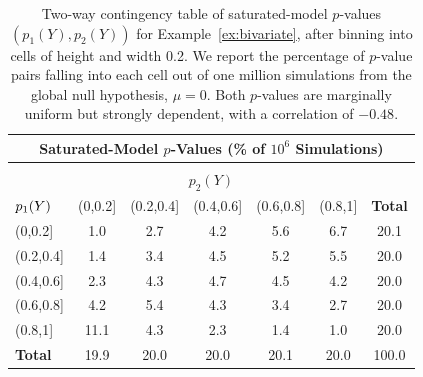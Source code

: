 \documentclass{article}
\begin{document}
\begin{table}[ht]
  \centering
  \begin{tabular}{l|ccccc|c}
    \multicolumn{7}{c}{Saturated-Model $p$-Values 
      (\% of $10^6$ Simulations)}\\[7pt]
    \hline
    \multicolumn{7}{c}{}\\[-1.5ex]
    \multicolumn{7}{c}{$p_2(Y)$}\\[5pt]
    ${\large p_1(Y)}$ & (0,0.2] & (0.2,0.4] & (0.4,0.6] & (0.6,0.8] & (0.8,1] & \textbf{Total} \\ 
    \hline
    (0,0.2] & 1.0 & 2.7 & 4.2 & 5.6 & 6.7 & 20.1 \\ 
    (0.2,0.4] & 1.4 & 3.4 & 4.5 & 5.2 & 5.5 & 20.0 \\ 
    (0.4,0.6] & 2.3 & 4.3 & 4.7 & 4.5 & 4.2 & 20.0 \\ 
    (0.6,0.8] & 4.2 & 5.4 & 4.3 & 3.4 & 2.7 & 20.0 \\ 
    (0.8,1] & 11.1 & 4.3 & 2.3 & 1.4 & 1.0 & 20.0 \\ 
    \hline
    \textbf{Total} & 19.9 & 20.0 & 20.0 & 20.1 & 20.0 & 100.0 \\ 
    \hline
  \end{tabular}
  \caption{Two-way contingency table of saturated-model $p$-values $(p_1(Y), p_2(Y))$ for Example~\ref{ex:bivariate}, after binning into cells of height and width 0.2. We report the percentage of $p$-value pairs falling into each cell out of one million simulations from the global null hypothesis, $\mu=0$. Both $p$-values are marginally uniform but strongly dependent, with a correlation of $-0.48$.}
\label{tab:bv_twoWayTable}
\end{table}

\end{document}
